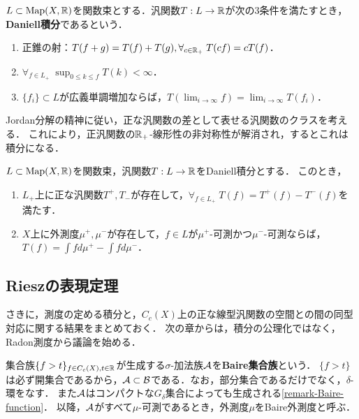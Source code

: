 \documentclass[uplatex,dvipdfmx]{jsreport}
\begin{document}
\begin{definition}
    $L\subset\mathrm{Map}(X,\mathbb{R})$を関数束とする．汎関数$T:L\to\mathbb{R}$が次の3条件を満たすとき，\textbf{Daniell積分}であるという．
    \begin{enumerate}
        \item 正錐の射：$T(f+g)=T(f)+T(g),\forall_{c\in\mathbb{R}_+}\;T(cf)=cT(f)$．
        \item $\forall_{f\in L_+}\;\sup_{0\le k\le f}T(k)<\infty$．
        \item $\{f_i\}\subset L$が広義単調増加ならば，$T(\lim_{i\to\infty}f)=\lim_{i\to\infty}T(f_i)$．
    \end{enumerate}
\end{definition}
\begin{remarks}
    Jordan分解の精神に従い，正な汎関数の差として表せる汎関数のクラスを考える．
    これにより，正汎関数の$\mathbb{R}_+$-線形性の非対称性が解消され，するとこれは積分になる．
\end{remarks}

\begin{theorem}
    $L\subset\mathrm{Map}(X,\mathbb{R})$を関数束，汎関数$T:L\to\mathbb{R}$をDaniell積分とする．
    このとき，
    \begin{enumerate}
        \item $L_+$上に正な汎関数$T^+,T_-$が存在して，$\forall_{f\in L_+}\;T(f)=T^+(f)-T^-(f)$を満たす．
        \item $X$上に外測度$\mu^+,\mu^-$が存在して，$f\in L$が$\mu^+$-可測かつ$\mu^-$-可測ならば，$T(f)=\int fd\mu^+-\int fd\mu^-$．
    \end{enumerate}
\end{theorem}

\subsection{Rieszの表現定理}

\begin{tcolorbox}[colframe=ForestGreen, colback=ForestGreen!10!white,breakable,colbacktitle=ForestGreen!40!white,coltitle=black,fonttitle=\bfseries\sffamily,
title=]
    さきに，測度の定める積分と，$C_c(X)$上の正な線型汎関数の空間との間の同型対応に関する結果をまとめておく．
    次の章からは，積分の公理化ではなく，Radon測度から議論を始める．
\end{tcolorbox}

\begin{definition}
    集合族$\{f>t\}_{f\in C_c(X),t\in\mathbb{R}}$が生成する$\sigma$-加法族$\mathcal{A}$を\textbf{Baire集合族}という．
    $\{f>t\}$は必ず開集合であるから，$\mathcal{A}\subset\mathcal{B}$である．なお，部分集合であるだけでなく，$\delta$-環をなす．
    また$\mathcal{A}$はコンパクトな$G_\delta$集合によっても生成される\ref{remark-Baire-function}．
    以降，$\mathcal{A}$がすべて$\mu$-可測であるとき，外測度$\mu$をBaire外測度と呼ぶ．
\end{definition}
\end{document}
